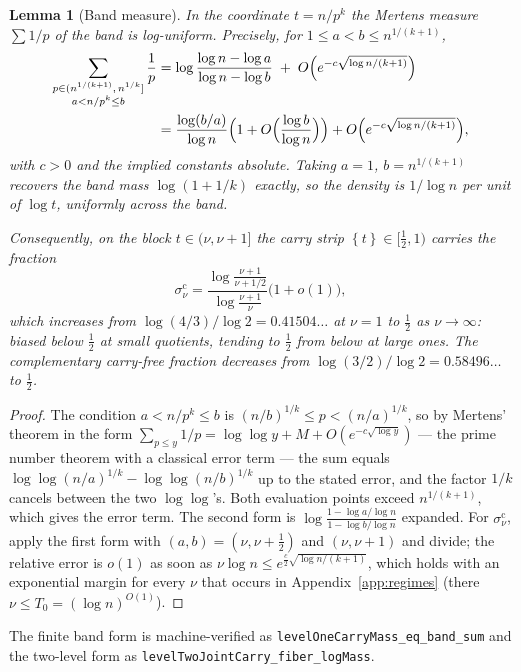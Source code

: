 \documentclass[11pt]{article}
\newtheorem{lemma}[theorem]{Lemma}
\theoremstyle{definition}
\theoremstyle{plain}
\newcommand{\fpart}[1]{\left\{#1\right\}}
\begin{document}
\begin{lemma}[Band measure]\label{lem:measure}
In the coordinate $t=n/p^k$ the Mertens measure $\sum1/p$ of the band is
log-uniform.  Precisely, for $1\le a<b\le n^{1/(k+1)}$,
\begin{align*}
\sum_{\substack{p\in(n^{1/(k+1)},\,n^{1/k}]\\ a<n/p^k\le b}}\frac1p
&=\log\frac{\log n-\log a}{\log n-\log b}
\;+\;O\Bigl(e^{-c\sqrt{\log n/(k+1)}}\Bigr)\\
&=\frac{\log(b/a)}{\log n}\Bigl(1+O\Bigl(\frac{\log b}{\log n}\Bigr)\Bigr)
+O\Bigl(e^{-c\sqrt{\log n/(k+1)}}\Bigr),
\end{align*}
with $c>0$ and the implied constants absolute.  Taking $a=1$,
$b=n^{1/(k+1)}$ recovers the band mass $\log(1+1/k)$ exactly, so the
density is $1/\log n$ per unit of $\log t$, uniformly across the band.

Consequently, on the block $t\in(\nu,\nu+1]$ the carry strip
$\fpart{t}\in[\tfrac12,1)$ carries the fraction
\[
\sigma^{\mathrm c}_{\nu}
=\frac{\log\frac{\nu+1}{\nu+1/2}}{\log\frac{\nu+1}{\nu}}\bigl(1+o(1)\bigr),
\]
which increases from $\log(4/3)/\log2=0.41504\ldots$ at $\nu=1$ to
$\tfrac12$ as $\nu\to\infty$: biased below $\tfrac12$ at small quotients,
tending to $\tfrac12$ from below at large ones.  The complementary
carry-free fraction decreases from $\log(3/2)/\log2=0.58496\ldots$ to
$\tfrac12$.
\end{lemma}

\begin{proof}
The condition $a<n/p^k\le b$ is $(n/b)^{1/k}\le p<(n/a)^{1/k}$, so by
Mertens' theorem in the form
$\sum_{p\le y}1/p=\log\log y+M+O(e^{-c\sqrt{\log y}})$ --- the prime
number theorem with a classical error term --- the sum equals
$\log\log(n/a)^{1/k}-\log\log(n/b)^{1/k}$ up to the stated error, and the
factor $1/k$ cancels between the two $\log\log$'s.  Both evaluation
points exceed $n^{1/(k+1)}$, which gives the error term.  The second form
is $\log\frac{1-\log a/\log n}{1-\log b/\log n}$ expanded.  For
$\sigma^{\mathrm c}_{\nu}$, apply the first form with
$(a,b)=(\nu,\nu+\tfrac12)$ and $(\nu,\nu+1)$ and divide; the relative
error is $o(1)$ as soon as $\nu\log n\le e^{\frac{c}{2}\sqrt{\log n/(k+1)}}$,
which holds with an exponential margin for every $\nu$ that occurs in
Appendix~\ref{app:regimes} (there $\nu\le T_0=(\log n)^{O(1)}$).
\end{proof}

The finite band form is machine-verified as
\texttt{levelOneCarryMass\_eq\_band\_sum} and the two-level form as
\texttt{levelTwoJointCarry\_fiber\_logMass}.
\end{document}
